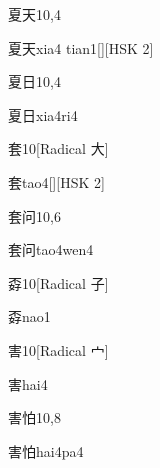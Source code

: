 \begin{entry}{夏天}{10,4}
  \begin{phonetics}{夏天}{xia4 tian1}[][HSK 2]
  \end{phonetics}
\end{entry}

\begin{entry}{夏日}{10,4}
  \begin{phonetics}{夏日}{xia4ri4}
  \end{phonetics}
\end{entry}

\begin{entry}{套}{10}[Radical 大]
  \begin{phonetics}{套}{tao4}[][HSK 2]
  \end{phonetics}
\end{entry}

\begin{entry}{套问}{10,6}
  \begin{phonetics}{套问}{tao4wen4}
  \end{phonetics}
\end{entry}

\begin{entry}{孬}{10}[Radical 子]
  \begin{phonetics}{孬}{nao1}
  \end{phonetics}
\end{entry}

\begin{entry}{害}{10}[Radical 宀]
  \begin{phonetics}{害}{hai4}
  \end{phonetics}
\end{entry}

\begin{entry}{害怕}{10,8}
  \begin{phonetics}{害怕}{hai4pa4}
  \end{phonetics}
\end{entry}


